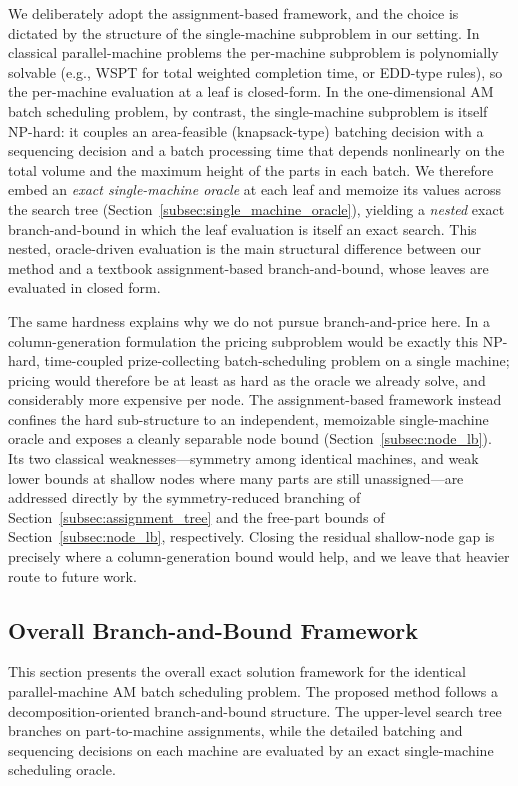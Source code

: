 \documentclass[review,3p,times,authoryear]{elsarticle}
\begin{document}
We deliberately adopt the assignment-based framework, and the choice is dictated
by the structure of the single-machine subproblem in our setting. In classical
parallel-machine problems the per-machine subproblem is polynomially solvable
(e.g., WSPT for total weighted completion time, or EDD-type rules), so the
per-machine evaluation at a leaf is closed-form. In the one-dimensional AM batch
scheduling problem, by contrast, the single-machine subproblem is itself
NP-hard: it couples an area-feasible (knapsack-type) batching decision with a
sequencing decision and a batch processing time that depends nonlinearly on the
total volume and the maximum height of the parts in each batch. We therefore
embed an \emph{exact single-machine oracle} at each leaf and memoize its values
across the search tree (Section~\ref{subsec:single_machine_oracle}), yielding a
\emph{nested} exact branch-and-bound in which the leaf evaluation is itself an
exact search. This nested, oracle-driven evaluation is the main structural
difference between our method and a textbook assignment-based branch-and-bound,
whose leaves are evaluated in closed form.

The same hardness explains why we do not pursue branch-and-price here. In a
column-generation formulation the pricing subproblem would be exactly this
NP-hard, time-coupled prize-collecting batch-scheduling problem on a single
machine; pricing would therefore be at least as hard as the oracle we already
solve, and considerably more expensive per node. The assignment-based framework
instead confines the hard sub-structure to an independent, memoizable
single-machine oracle and exposes a cleanly separable node bound
(Section~\ref{subsec:node_lb}). Its two classical weaknesses---symmetry among
identical machines, and weak lower bounds at shallow nodes where many parts are
still unassigned---are addressed directly by the symmetry-reduced branching of
Section~\ref{subsec:assignment_tree} and the free-part bounds of
Section~\ref{subsec:node_lb}, respectively. Closing the residual shallow-node gap
is precisely where a column-generation bound would help, and we leave that
heavier route to future work.

\subsection{Overall Branch-and-Bound Framework}
\label{subsec:overall_framework}

This section presents the overall exact solution framework for the identical
parallel-machine AM batch scheduling problem. The proposed method follows a
decomposition-oriented branch-and-bound structure. The upper-level search
tree branches on part-to-machine assignments, while the detailed batching
and sequencing decisions on each machine are evaluated by an exact
single-machine scheduling oracle.
\end{document}
